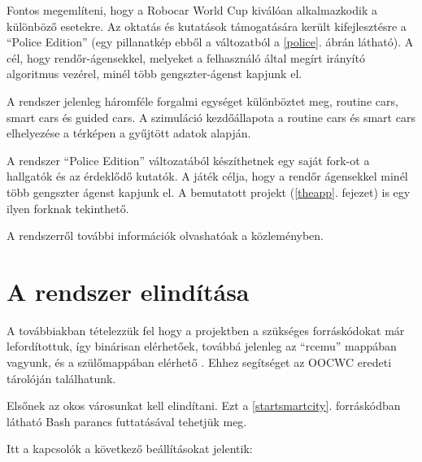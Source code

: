 \documentclass[a4paper,12pt]{report}
\begin{document}
\vspace{2mm}
Fontos megemlíteni, hogy a Robocar World Cup kiválóan alkalmazkodik a különböző esetekre. Az oktatás és kutatások támogatására került kifejlesztésre a ``Police Edition'' (egy pillanatkép ebből a változatból a \ref{police}. ábrán látható). A cél, hogy rendőr-ágensekkel, melyeket a felhasználó által megírt irányító algoritmus vezérel, minél több gengszter-ágenst kapjunk el.

\vspace{2mm}
A rendszer jelenleg háromféle forgalmi egységet különböztet meg, routine cars, smart cars és guided cars. A szimuláció kezdőállapota a routine cars és smart cars elhelyezése a térképen a gyűjtött adatok alapján.

\vspace{2mm}
A rendszer ``Police Edition'' változatából készíthetnek egy saját fork-ot a hallgatók és az érdeklődő kutatók. A játék célja, hogy a rendőr ágensekkel minél több gengszter ágenst kapjunk el. A bemutatott projekt (\ref{theapp}. fejezet) is egy ilyen forknak tekinthető.

\vspace{2mm}
A rendszerről további információk olvashatóak a \cite{infocomjournal} közleményben.

\section{A rendszer elindítása}
\label{howtostart}

A továbbiakban tételezzük fel hogy a projektben a szükséges forráskódokat már lefordítottuk, így binárisan elérhetőek, továbbá jelenleg az ``rcemu'' mappában vagyunk, és a szülőmappában elérhető . Ehhez segítséget az OOCWC eredeti tárolóján \cite{oocwcrepo} találhatunk.

\vspace{2mm}
Elsőnek az okos városunkat kell elindítani. Ezt a \ref{startsmartcity}. forráskódban látható Bash parancs futtatásával  tehetjük meg.



Itt a kapcsolók a következő beállításokat jelentik:
\end{document}
